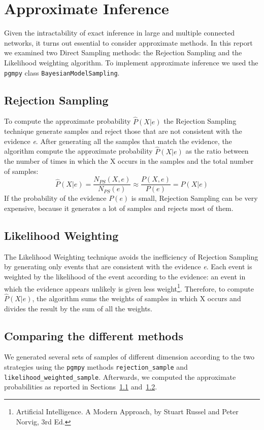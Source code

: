 \documentclass[letterpaper,11pt]{article}
\begin{document}
\section{Approximate Inference}
Given the intractability of exact inference in large and multiple connected networks,
it turns out essential to consider approximate methods. In this report we examined two Direct
Sampling methods: the Rejection Sampling and the Likelihood weighting algorithm. 
To implement approximate inference we used the \texttt{pgmpy} class \texttt{BayesianModelSampling}. 

\subsection{Rejection Sampling}
\label{sec:rs}
To compute the approximate probability $\widehat{P}(X| e)$ the Rejection Sampling technique
generate samples and reject those that are not consistent with the evidence \textit{e}.
After generating all the samples that match the evidence, the algorithm compute the
approximate probability $\widehat{P}(X| e)$ as the ratio between the number of times in which the X occurs
in the samples and the total number of samples:
\[
\widehat{P}(X| e)= \frac{N_{PS}(X, e)}{N_{PS}(e)} \approx \frac{P(X, e)}{P(e)} = P(X| e)
\]
If the probability of the evidence $P(e)$ is small, Rejection Sampling can be very expensive, because it generates a lot of samples and rejects most of them.

\subsection{Likelihood Weighting}
\label{sec:lw}
The Likelihood Weighting technique avoids the inefficiency of Rejection Sampling by generating 
only events that are consistent with the evidence \textit{e}.
Each event is weighted by the likelihood of the event according to the evidence:
an event in which the evidence appears unlikely is given less weight\footnote{Artificial Intelligence. A Modern Approach, by Stuart Russel and Peter
Norvig, 3rd Ed.}. Therefore, to compute $\widehat{P}(X| e)$, the algorithm sums the weights 
of samples in which X occurs and divides the result by the sum of all the weights.

\subsection{Comparing the different methods}
We generated several sets of samples of different dimension according to the two 
 strategies using the \texttt{pgmpy} 
methods \texttt{rejection\_sample} and \texttt{likelihood\_weighted\_sample}. Afterwards, 
we computed the approximate probabilities as reported in Sections~\ref{sec:rs} and~\ref{sec:lw}.\\
\end{document}
